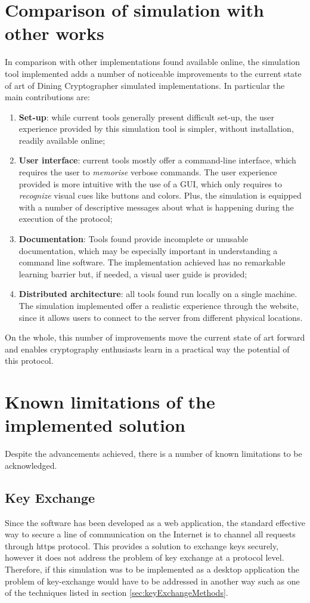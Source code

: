 \section{Comparison of simulation with other works}
In comparison with other implementations found available online, the simulation tool implemented adds a number of noticeable improvements to the current state of art of Dining Cryptographer simulated implementations. In particular the main contributions are:
\begin{enumerate}
    \item \textbf{Set-up}: while current tools generally present difficult set-up, the user experience provided by this simulation tool is simpler, without installation, readily available online;
    \item \textbf{User interface}: current tools mostly offer a command-line interface, which requires the user to \textit{memorise} verbose commands. The user experience provided is more intuitive with the use of a GUI, which only requires to \textit{recognize} visual cues like buttons and colors. Plus, the simulation is equipped with a number of descriptive messages about what is happening during the execution of the protocol;
    \item \textbf{Documentation}: Tools found provide incomplete or unusable documentation, which may be especially important in understanding a command line software. The implementation achieved has no remarkable learning barrier but, if needed, a visual user guide is provided;
    \item \textbf{Distributed architecture}: all tools found run locally on a single machine. The simulation implemented offer a realistic experience through the website, since it allows users to connect to the server from different physical locations.
\end{enumerate}

On the whole, this number of improvements move the current state of art forward and enables cryptography enthusiasts learn in a practical way the potential of this protocol.

\section{Known limitations of the implemented solution}
Despite the advancements achieved, there is a number of known limitations to be acknowledged. 

\subsection{Key Exchange}
Since the software has been developed as a web application, the standard effective way to secure a line of communication on the Internet is to channel all requests through https protocol. This provides a solution to exchange keys securely, however it does not address the problem of key exchange at a protocol level. Therefore, if this simulation was to be implemented as a desktop application the problem of key-exchange would have to be addressed in another way such as one of the techniques listed in section \ref{sec:keyExchangeMethods}.

